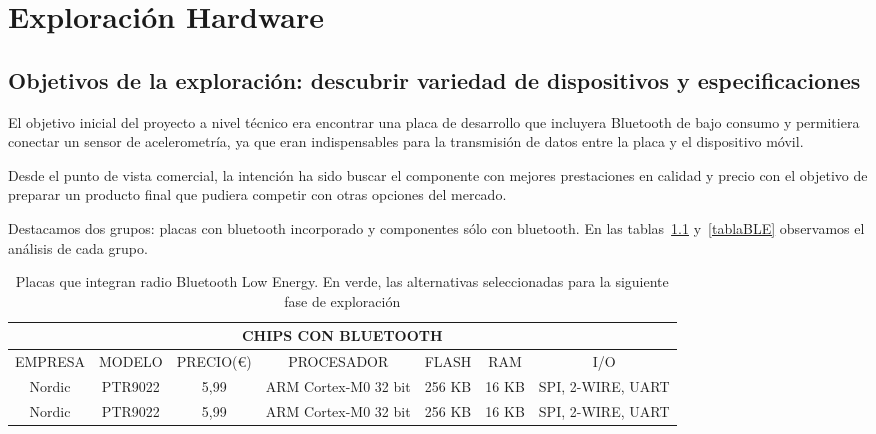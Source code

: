 
\cleardoublepage


\chapter{Exploración Hardware}
\label{makereference3}

\section{Objetivos de la exploración: descubrir variedad de dispositivos y especificaciones}
\label{makereference3.1}

El objetivo inicial del proyecto a nivel técnico era encontrar una placa de desarrollo que incluyera Bluetooth de bajo consumo y permitiera conectar  un sensor de acelerometría, ya que eran indispensables para la transmisión de datos entre la placa y el dispositivo móvil. 

Desde el punto de vista comercial, la intención ha sido buscar el componente con mejores prestaciones en calidad y precio con el objetivo de preparar un producto final que pudiera competir con otras opciones del mercado.

Destacamos dos grupos: placas con bluetooth incorporado y componentes sólo con  bluetooth. En las tablas~\ref{tablaSoCBLE} y~\ref{tablaBLE} observamos el análisis de cada grupo.

\begin{table}
	\begin{center}
	\begin{small}
	\begin{tabular}[c]{|c|c|c|c|c|c|c|}
        \hline
        \multicolumn{7}{|c|}{CHIPS CON BLUETOOTH} \\
        \hline
        EMPRESA & MODELO & PRECIO(\euro{}) & PROCESADOR &  FLASH &  RAM & I/O \\
        \hline
        Nordic & PTR9022 & 5,99 & ARM Cortex-M0 32 bit & 256 KB & 16 KB & SPI, 2-WIRE, UART \\
        Nordic & PTR9022 & 5,99 & ARM Cortex-M0 32 bit & 256 KB & 16 KB & SPI, 2-WIRE, UART \\
    	\hline
	\end{tabular}
	\end{small}
    \caption{Placas que integran radio Bluetooth Low Energy. En verde, las alternativas seleccionadas para la siguiente fase de exploración}
    \label{tablaSoCBLE}
   \end{center}
\end{table}

